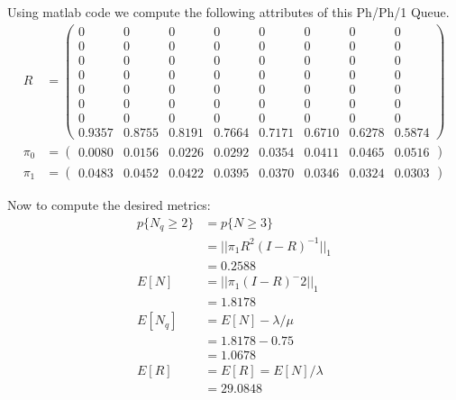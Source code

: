 \documentclass[fleqn]{article}
\newcommand{\mm}[1]{\begin{pmatrix}#1\end{pmatrix}}
\newcommand{\nn}[1]{ \begin{align*}#1\end{align*}}
\begin{document}
Using matlab code we compute the following attributes of this Ph/Ph/1 Queue. 
\nn{
	R &= \mm{
	  0 &       0 &       0 &      0  &      0  &      0  &      0  &      0\\
      0 &       0 &       0 &       0 &       0 &       0 &       0 &       0\\
      0 &       0 &       0 &       0 &       0 &       0 &       0 &       0\\
      0 &       0 &       0 &       0 &       0 &       0 &       0 &       0\\
      0 &       0 &       0 &       0 &       0 &       0 &       0 &       0\\
      0 &       0 &       0 &       0 &       0 &       0 &       0 &       0\\
      0 &       0 &       0 &       0 &       0 &       0 &       0 &       0\\
 0.9357 &  0.8755 &  0.8191 &  0.7664 &  0.7171 &  0.6710 &  0.6278 & 0.5874
  }\\
  \pi_0 &=\mm{0.0080 &  0.0156&   0.0226 &  0.0292 &  0.0354& 0.0411& 0.0465& 0.0516}\\
  \pi_1 &=\mm{0.0483& 0.0452& 0.0422& 0.0395& 0.0370& 0.0346& 0.0324 &0.0303 }
}

Now to compute the desired metrics: \\
\nn{
	p\{N_q \geq 2\} &= p\{N \geq 3\} \\
					&= || \pi_1 R^{2}(I-R)^{-1}||_1\\
					&= \boxed{0.2588}\\
	E[N] 			&= ||\pi_1(I-R)^-2||_1\\
					&= \boxed{1.8178}\\
	E[N_q]			&= E[N] - \lambda/\mu\\
					&= 1.8178 - 0.75\\
					&= 1.0678\\
	E[R]			&= E[R] = E[N]/\lambda \\
					&= \boxed{29.0848}
}
\end{document}

